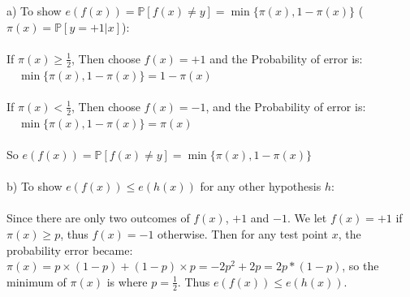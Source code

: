 \documentclass[12pt]{article}
\begin{document}
 \\\\
a) To show $e(f( {x})) = \mathbb{P}[f( {x})\neq y] = \min\{\pi( {x}), 1-\pi( {x})\}$ ($\pi( {x}) = \mathbb{P}[y=+1\big| {x}]$): \\\\
\indent If $\pi( {x}) \geq \frac{1}{2}$, Then choose $f( {x}) = +1$ and the Probability of error is:\\ 
$\quad \min\{\pi( {x}), 1-\pi( {x})\} = 1-\pi( {x})$\\\\
\indent If $\pi( {x}) < \frac{1}{2}$, Then choose $f( {x}) = -1$, and the Probability of error is:\\ 
$\quad \min\{\pi( {x}), 1-\pi( {x})\} = \pi( {x})$\\\\
\indent So $e(f( {x})) = \mathbb{P}[f( {x})\neq y] = \min\{\pi( {x}), 1-\pi( {x})\}$\\\\
b) To show $e(f( {x}))\leq e(h( {x}))$  for any other hypothesis $h$: \\\\
\indent Since there are only two outcomes of $f(x)$, $+1$ and $-1$. We let $f(x) = +1$ if $\pi(x) \geq p$, thus $f(x) = -1$ otherwise. Then for any test point $x$, the probability error became: $\pi(x) = p\times (1-p) + (1-p)\times p = -2p^2 + 2p = 2p*(1-p)$, so the minimum of $\pi(x)$ is where $p = \frac{1}{2}$. Thus $e(f( {x}))\leq e(h( {x}))$.
\end{document}
